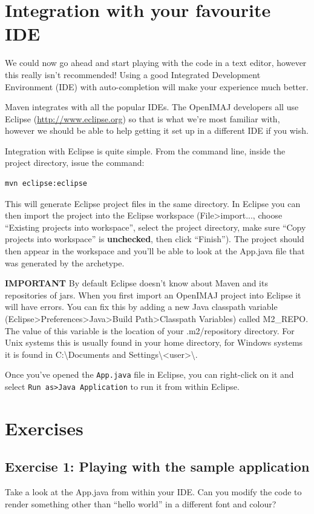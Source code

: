 \documentclass[10pt,a4paper,twoside,extrafontsizes]{memoir}
\begin{document}
\section*{Integration with your favourite IDE}
We could now go ahead and start playing with the code in a text editor, however this really 
isn't recommended! Using a good Integrated Development Environment (IDE) with auto-completion will 
make your experience much better.

Maven integrates with all the popular IDEs. The OpenIMAJ developers all use Eclipse 
(\url{http://www.eclipse.org}) so that is what we're most familiar with, however we should be able 
to help getting it set up in a different IDE if you wish. 

Integration with Eclipse is quite simple. From the command line, inside the project directory, 
issue the command:
\begin{lstlisting}[language=bash]
mvn eclipse:eclipse
\end{lstlisting}
This will generate Eclipse project files in the same directory. In Eclipse you can then import 
the project into the Eclipse workspace (File>import..., choose ``Existing projects into workspace'', 
select the project directory, make sure ``Copy projects into workspace'' is \textbf{unchecked}, then click
 ``Finish''). The project should then appear in the workspace and you'll be able to look at the 
App.java file that was generated by the archetype.

\textbf{IMPORTANT} By default Eclipse doesn't know about Maven and its repositories of jars. When you 
first import an OpenIMAJ project into Eclipse it will have errors. You can fix this by adding 
a new Java classpath variable (Eclipse>Preferences>Java>Build Path>Classpath Variables) 
called M2\_REPO. The value of this variable is the location of your .m2/repository directory. 
For Unix systems this is usually found in your home directory, for Windows systems it is found 
in C:{\textbackslash}Documents and Settings{\textbackslash}<user>{\textbackslash}.

Once you've opened the \verb+App.java+ file in Eclipse, you can right-click on it and select 
\verb+Run as>Java Application+ to run it from within Eclipse.

\section*{Exercises}
\subsection{Exercise 1: Playing with the sample application}
Take a look at the App.java from within your IDE. Can you modify the code to render something 
other than ``hello world'' in a different font and colour? 
\end{document}
